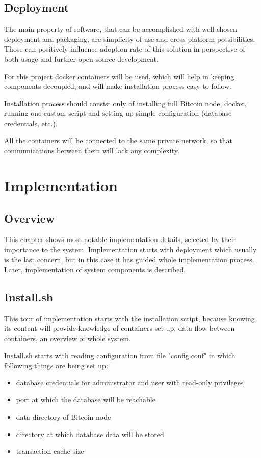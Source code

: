 \documentclass[12pt, en, eng, oneside]{mgr}
\begin{document}
\section{Deployment}

The main property of software, that can be accomplished with well chosen deployment and packaging, are simplicity of use and cross-platform possibilities. Those can positively influence adoption rate of this solution in perspective of both usage and further open source development.

For this project docker containers will be used, which will help in keeping components decoupled, and will make installation process easy to follow. 

Installation process should consist only of installing full Bitcoin node, docker, running one custom script and setting up simple configuration (database credentials, etc.).

All the containers will be connected to the same private network, so that communications between them will lack any complexity.

\chapter{Implementation}

\section{Overview}
This chapter shows most notable implementation details, selected by their importance to the system. Implementation starts with deployment which usually is the last concern, but in this case it has guided whole implementation process. Later, implementation of system components is described.

\section{Install.sh}
This tour of implementation starts with the installation script, because knowing its content will provide knowledge of containers set up, data flow between containers, an overview of whole system.

Install.sh starts with reading configuration from file "config.conf" in which following things are being set up:

\begin{itemize}
\item
database credentials for administrator and user with read-only privileges
\item
port at which the database will be reachable
\item
data directory of Bitcoin node
\item
directory at which database data will be stored
\item
transaction cache size
\end{itemize} 
\end{document}
